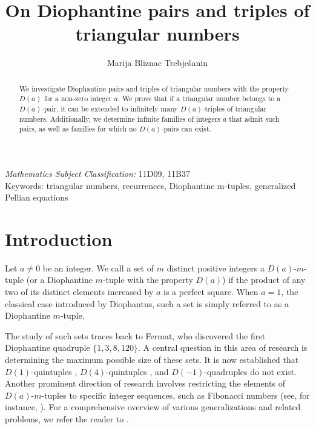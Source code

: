 \documentclass[12pt]{amsart}
\theoremstyle{definition}
\begin{document}
\title[On Diophantine pairs and triples of triangular numbers]{On Diophantine pairs and triples of triangular numbers}
\author{Marija {Bliznac Trebje\v{s}anin}}
\address{Faculty of Science, University of Split, Ru\dj{}era Bo\v{s}kovi\'{c}a 33, 21000 Split, Croatia}

\begin{abstract}
We investigate Diophantine pairs and triples of triangular numbers with the property $D(a)$ for a non-zero integer $a$. We prove that if a triangular number belongs to a $D(a)$-pair, it can be extended to infinitely many $D(a)$-triples of triangular numbers. Additionally, we determine infinite families of integers $a$ that admit such pairs, as well as families for which no $D(a)$-pairs can exist.
\end{abstract}

\maketitle

 {\it Mathematics Subject Classification:}  11D09, 11B37
\\ \noindent Keywords: triangular numbers, recurrences, Diophantine m-tuples, generalized Pellian equations

\section{Introduction}

Let $a\neq0$ be an integer. We call a set of $m$ distinct positive integers a $D(a)$-$m$-tuple (or a Diophantine $m$-tuple with the property $D(a)$) if the product of any two of its distinct elements increased by $a$ is a perfect square. 
When $a=1$, the classical case introduced by Diophantus, such a set is simply referred to as a Diophantine $m$-tuple.

The study of such sets traces back to Fermat, who discovered the first Diophantine quadruple $\{1, 3, 8, 120\}$. A central question in this area of research is determining the maximum possible size of these sets. It is now established that $D(1)$-quintuples \cite{htz}, $D(4)$-quintuples \cite{petorke_btf}, and $D(-1)$-quadruples \cite{bcm} do not exist. Another prominent direction of research involves restricting the elements of $D(a)$-$m$-tuples to specific integer sequences, such as Fibonacci numbers (see, for instance, \cite{duje_gen, fujita_luca_fib}). For a comprehensive overview of various generalizations and related problems, we refer the reader to \cite[Section 1.5]{duje_book}.
\end{document}
